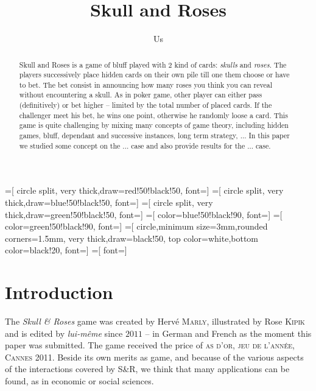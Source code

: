 \documentclass[]{article}       %
\author{Us}
\title{Skull and Roses}
\newcommand{\sr}{S\&{}R}
\begin{document}
=[%
circle split,
very thick,draw=red!50!black!50,
font=\ttfamily]
=[%
circle split,
very thick,draw=blue!50!black!50,
font=\ttfamily]
=[%
circle split,
very thick,draw=green!50!black!50,
font=\ttfamily]
=[%
color=blue!50!black!90,
font=\ttfamily]
=[%
color=green!50!black!90,
font=\ttfamily]
=[%
circle,minimum size=3mm,rounded corners=1.5mm,
very thick,draw=black!50,
top color=white,bottom color=black!20,
font=\ttfamily]
=[%
font=\ttfamily]

\maketitle

\begin{abstract}
Skull and Roses is a game of bluff played with $2$ kind of cards: \emph{skulls} and \emph{roses}. The players successively place hidden cards on their own pile till one them choose or have to bet. The bet consist in announcing how many roses  you think you can reveal without encountering a skull. As in poker game, other player can either pass (definitively) or bet higher -- limited by the total number of placed cards. If the challenger meet his bet, he wins one point, otherwise he randomly loose a card.\newline
This game is quite challenging by mixing many concepts of game theory, including hidden games, bluff, dependant and successive instances, long term strategy, ...
In this paper we studied some concept on the ... case and also provide results for the ... case.
\end{abstract}

\section{Introduction}
The \emph{Skull \& Roses} game was created by Hervé \textsc{Marly}, illustrated by Rose \textsc{Kipik} and is edited by \emph{lui-même} since $2011$ -- in German and French as the moment this paper was submitted. The game received the price of \textsc{as d'or, jeu de l'année, Cannes 2011}.\newline
Beside its own merits as game, and because of the various aspects of the interactions covered by \sr, we think that many applications can be found, as in economic or social sciences.
\end{document}
